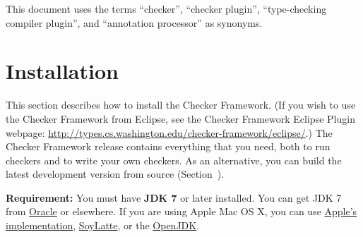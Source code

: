 





This document uses the terms ``checker'', ``checker plugin'',
``type-checking compiler plugin'', and ``annotation processor'' as
synonyms.

\section{Installation\label{installation}}

This section describes how to install the Checker Framework.
(If you wish to
use the Checker Framework from Eclipse, see the Checker Framework Eclipse
Plugin webpage: \url{http://types.cs.washington.edu/checker-framework/eclipse/}.)
The Checker Framework release contains everything that you need, both to
run checkers and to write your own checkers.  As an alternative, you can
build the latest development version from source
(Section~).

\textbf{Requirement:}
You must have \textbf{JDK 7} or later installed.  You can get JDK 7 from
\href{http://www.oracle.com/technetwork/java/javase/downloads/index.html}{Oracle}
or elsewhere.  If you are using Apple Mac OS X, you can use
\href{http://developer.apple.com/search/index.php?q=java}{Apple's implementation},
\href{http://landonf.bikemonkey.org/static/soylatte/}{SoyLatte},
or the \href{http://openjdk.java.net/}{OpenJDK}.

